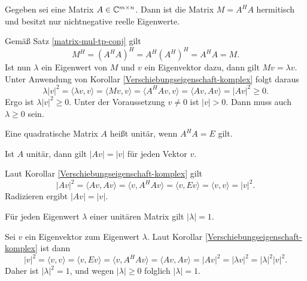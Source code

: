 \begin{Satz}
Gegeben sei eine Matrix $A\in\mathbb C^{m\times n}$.
Dann ist die Matrix $M=A^H A$ hermitisch und besitzt nur
nichtnegative reelle Eigenwerte.
\end{Satz}
\begin{Beweis}
Gemäß Satz \ref{matrix-mul-tp-conj} gilt
\begin{equation}
M^H = (A^H A)^H = A^H (A^H)^H = A^H A = M.
\end{equation}
Ist nun $\lambda$ ein Eigenwert von $M$ und $v$ ein Eigenvektor dazu,
dann gilt $Mv=\lambda v$. Unter Anwendung von Korollar
\ref{Verschiebungseigenschaft-komplex} folgt daraus
\begin{equation}
\lambda |v|^2 = \langle\lambda v,v\rangle
= \langle Mv,v\rangle = \langle A^H Av,v\rangle
= \langle Av,Av\rangle = |Av|^2\ge 0.
\end{equation}
Ergo ist $\lambda|v|^2\ge 0$. Unter der Voraussetzung $v\ne 0$
ist $|v|>0$. Dann muss auch $\lambda\ge 0$ sein.\;\qedsymbol
\end{Beweis}

\begin{Definition}\newlinefirst
Eine quadratische Matrix $A$ heißt unitär, wenn $A^H A=E$ gilt.
\end{Definition}

\begin{Korollar}
Ist $A$ unitär, dann gilt $|Av|=|v|$ für jeden Vektor $v$.
\end{Korollar}
\begin{Beweis}
Laut Korollar \ref{Verschiebungseigenschaft-komplex} gilt
\[|Av|^2 = \langle Av,Av\rangle = \langle v,A^H Av\rangle
= \langle v,Ev\rangle = \langle v,v\rangle = |v|^2.\]
Radizieren ergibt $|Av|=|v|$.\;\qedsymbol
\end{Beweis}

\begin{Korollar}
Für jeden Eigenwert $\lambda$ einer unitären Matrix gilt $|\lambda|=1$.
\end{Korollar}
\begin{Beweis}
Sei $v$ ein Eigenvektor zum Eigenwert $\lambda$. Laut Korollar
\ref{Verschiebungseigenschaft-komplex} ist dann
\[|v|^2 = \langle v,v\rangle = \langle v,Ev\rangle
= \langle v,A^H Av\rangle = \langle Av,Av\rangle
= |Av|^2 = |\lambda v|^2
= |\lambda|^2 |v|^2.\]
Daher ist $|\lambda|^2=1$, und wegen $|\lambda|\ge 0$ folglich $|\lambda|=1$.\;\qedsymbol
\end{Beweis}



